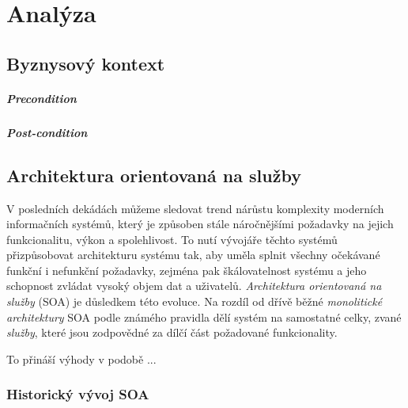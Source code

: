 \usepackage[T1]{fontenc}
\usepackage[utf8]{inputenc}
\usepackage{graphicx}


\chapter{Analýza}\label{ch:analyza}

\section{Byznysový kontext}

\paragraph{Precondition} %

\paragraph{Post-condition} %

\section{Architektura orientovaná na služby}

V posledních dekádách můžeme sledovat trend nárůstu komplexity
moderních informačních systémů, který je způsoben stále náročnějšími
požadavky na jejich funkcionalitu, výkon a spolehlivost. To nutí
vývojáře těchto systémů přizpůsobovat architekturu systému tak,
aby uměla splnit všechny očekávané funkční i nefunkční požadavky,
zejména pak škálovatelnost systému a jeho schopnost zvládat vysoký
objem dat a uživatelů. \textit{Architektura orientovaná na služby} (SOA) je
důsledkem této evoluce. Na rozdíl od dřívě běžné \textit{monolitické architektury}
SOA podle známého pravidla 
dělí systém na samostatné celky, zvané \textit{služby}, které jsou
zodpovědné za dílčí část požadované funkcionality.


To přináší výhody v podobě ... %

\subsection{Historický vývoj SOA}

